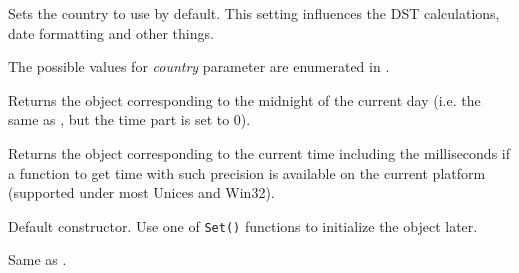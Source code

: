 


\label{wxdatetimesetcountry}


Sets the country to use by default. This setting influences the DST
calculations, date formatting and other things.

The possible values for {\it country} parameter are enumerated in
.




\label{wxdatetimetoday}


Returns the object corresponding to the midnight of the current day (i.e. the
same as , but the time part is set to $0$).




\label{wxdatetimeunow}


Returns the object corresponding to the current time including the
milliseconds if a function to get time with such precision is available on the
current platform (supported under most Unices and Win32).





\label{wxdatetimewxdatetimedef}


Default constructor. Use one of {\tt Set()} functions to initialize the object
later.


\label{wxdatetimewxdatetimetimet}


Same as .



